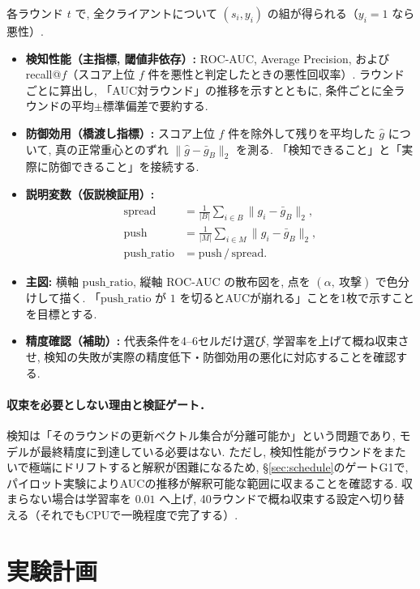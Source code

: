 \documentclass[a4j, twocolumn, dvipdfmx]{jsarticle}
\begin{document}
各ラウンド $t$ で, 全クライアントについて $(s_i, y_i)$ の組が得られる（$y_i = 1$ なら悪性）.

\begin{itemize}
  \item \textbf{検知性能（主指標, 閾値非依存）:} ROC-AUC, Average Precision, および recall@$f$（スコア上位 $f$ 件を悪性と判定したときの悪性回収率）. ラウンドごとに算出し, 「AUC対ラウンド」の推移を示すとともに, 条件ごとに全ラウンドの平均$\pm$標準偏差で要約する.
  \item \textbf{防御効用（橋渡し指標）:} スコア上位 $f$ 件を除外して残りを平均した $\hat{g}$ について, 真の正常重心とのずれ $\|\hat{g} - \bar{g}_B\|_2$ を測る. 「検知できること」と「実際に防御できること」を接続する.
  \item \textbf{説明変数（仮説検証用）:}
  \begin{align*}
    \mathrm{spread} &= \tfrac{1}{|B|}\textstyle\sum_{i \in B}\|g_i - \bar{g}_B\|_2, \\
    \mathrm{push}   &= \tfrac{1}{|M|}\textstyle\sum_{i \in M}\|g_i - \bar{g}_B\|_2, \\
    \mathrm{push\_ratio} &= \mathrm{push}\,/\,\mathrm{spread}.
  \end{align*}
  \item \textbf{主図:} 横軸 $\mathrm{push\_ratio}$, 縦軸 ROC-AUC の散布図を, 点を $(\alpha,\ \text{攻撃})$ で色分けして描く. 「$\mathrm{push\_ratio}$ が $1$ を切るとAUCが崩れる」ことを1枚で示すことを目標とする.
  \item \textbf{精度確認（補助）:} 代表条件を4--6セルだけ選び, 学習率を上げて概ね収束させ, 検知の失敗が実際の精度低下・防御効用の悪化に対応することを確認する.
\end{itemize}

\paragraph{収束を必要としない理由と検証ゲート．}
検知は「そのラウンドの更新ベクトル集合が分離可能か」という問題であり, モデルが最終精度に到達している必要はない. ただし, 検知性能がラウンドをまたいで極端にドリフトすると解釈が困難になるため, \S\ref{sec:schedule}のゲートG1で, パイロット実験によりAUCの推移が解釈可能な範囲に収まることを確認する. 収まらない場合は学習率を $0.01$ へ上げ, 40ラウンドで概ね収束する設定へ切り替える（それでもCPUで一晩程度で完了する）.

\section{実験計画}
\end{document}
